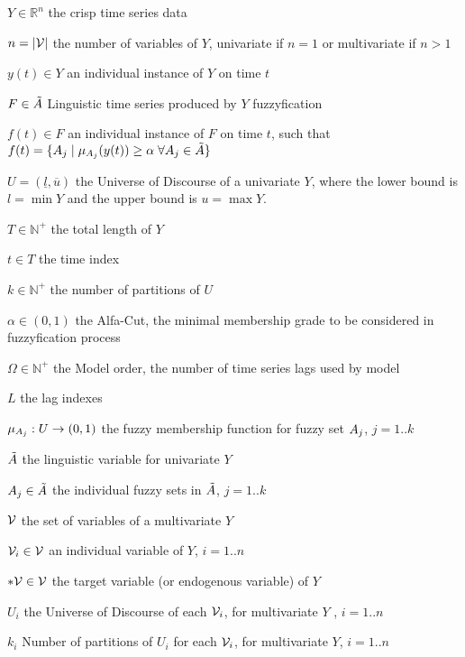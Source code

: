 
\begin{simbolos}

\item[$Y \in \mathbb{R}^n$]  the crisp time series data 
\item[$n = |\mathcal{V}|$] the number of variables of $Y$, univariate if $n=1$ or multivariate if $n > 1$
\item[$y(t) \in Y$] an individual instance of $Y$ on time $t$
\item[$F \in \tilde{A}$] Linguistic time series produced by $Y$ fuzzyfication 
\item[$f(t) \in F$] an individual instance of $F$ on time $t$, such that $f(t) = \{ A_j\;|\; \mu_{A_j}(y(t)) \geq \alpha\; \forall A_j \in \tilde{A} \}$
\item[$U = (\underline{l},\overline{u})$] the Universe of Discourse of a univariate $Y$, where the lower bound is $l = \min Y$ and the upper bound is $u = \max Y$.
\item[$T \in \mathbb{N}^+$] the total length of $Y$
\item[$t \in T$]  the time index
\item[$k \in \mathbb{N}^+$] the number of partitions of $U$
\item[$\alpha \in (0,1)$] the Alfa-Cut, the minimal membership grade to be considered in fuzzyfication process
\item[$\Omega \in \mathbb{N}^+$] the Model order, the number of time series lags used by model
\item[$L$] the lag indexes
\item[$\mu_{A_j}: U \rightarrow (0,1)$] the fuzzy membership function for fuzzy set $A_j$, $j = 1..k$ 
\item[$\tilde{A}$] the linguistic variable for univariate $Y$
\item[$A_j \in \tilde{A}$] the individual fuzzy sets in $\tilde{A}$, $j = 1..k$
\item[$\mathcal{V}$] the set of variables of a multivariate $Y$
\item[$\mathcal{V}_i \in \mathcal{V}$] an individual variable of $Y$, $i = 1..n$
\item[$*\mathcal{V} \in \mathcal{V}$] the target variable (or endogenous variable) of $Y$ 
\item[$U_i$]  the Universe of Discourse of each  $\mathcal{V}_i$, for multivariate $Y$ , $i = 1..n$
\item[$k_i$] Number of partitions of $U_i$ for each  $\mathcal{V}_i$, for multivariate $Y$, $i = 1..n$

\end{simbolos}
